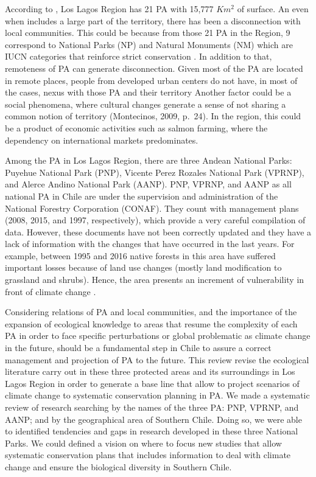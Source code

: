 \documentclass[]{article}
\begin{document}
According to \citet{ProtectedAreas}, Los Lagos Region has 21 PA with 15,777 \(Km^2\) of surface.
An even when includes a large part of the territory, there has been a disconnection with local communities.
This could be because from those 21 PA in the Region, 9 correspond to National Parks (NP) and Natural Monuments (NM) which are IUCN categories that reinforce strict conservation \citep{dudley2008guidelines}.
In addition to that, remoteness of PA can generate disconnection. Given most of the PA are located in remote places, people from developed urban centers do not have, in most of the cases, nexus with those PA and their territory \citep{joppa2009high}
Another factor could be a social phenomena, where cultural changes generate a sense of not sharing a common notion of territory (Montecinos, 2009, p.~24). In the region, this could be a product of economic activities such as salmon farming, where the dependency on international markets predominates.

Among the PA in Los Lagos Region, there are three Andean National Parks: Puyehue National Park (PNP), Vicente Perez Rozales National Park (VPRNP), and Alerce Andino National Park (AANP). PNP, VPRNP, and AANP as all national PA in Chile are under the supervision and administration of the National Forestry Corporation (CONAF). They count with management plans (2008, 2015, and 1997, respectively), which provide a very careful compilation of data. However, these documents have not been correctly updated and they have a lack of information with the changes that have occurred in the last years. For example, between 1995 and 2016 native forests in this area have suffered important losses because of land use changes (mostly land modification to grassland and shrubs).
Hence, the area presents an increment of vulnerability in front of climate change \citep{marquet2019biodiversidad}.

Considering relations of PA and local communities, and the importance of the expansion of ecological knowledge to areas that resume the complexity of each PA in order to face specific perturbations or global problematic as climate change in the future, should be a fundamental step in Chile to assure a correct management and projection of PA to the future.
This review revise the ecological literature carry out in these three protected areas and its surroundings in Los Lagos Region in order to generate a base line that allow to project scenarios of climate change to systematic conservation planning in PA.
We made a systematic review of research searching by the names of the three PA: PNP, VPRNP, and AANP; and by the geographical area of Southern Chile.
Doing so, we were able to identified tendencies and gaps in research developed in these three National Parks. We could defined a vision on where to focus new studies that allow systematic conservation plans that includes information to deal with climate change and ensure the biological diversity in Southern Chile.
\end{document}
